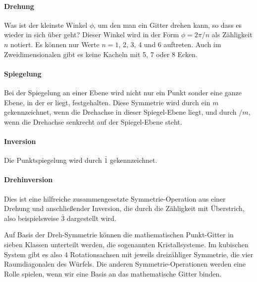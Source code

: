 \paragraph{Drehung} Was ist der kleinste Winkel $\phi$, um den man ein Gitter drehen kann, so dass es wieder in sich über geht? Dieser Winkel wird in der Form $\phi = 2 \pi / n$ als Zähligkeit $n$ notiert. Es können nur Werte $n= 1$, 2, 3, 4 und 6 auftreten. Auch im Zweidimensionalen gibt es keine Kacheln mit 5, 7 oder 8 Ecken.

\paragraph{Spiegelung} Bei der Spiegelung an einer Ebene wird nicht nur ein Punkt sonder eine ganze Ebene, in der er liegt, festgehalten. Diese Symmetrie wird durch ein $m$ gekennzeichnet, wenn die Drehachse in dieser Spiegel-Ebene liegt, und durch $/m$, wenn die Drehachse senkrecht auf der Spiegel-Ebene steht.

\paragraph{Inversion} Die Punktspiegelung wird durch $\bar{1}$ gekennzeichnet.

\paragraph{Drehinversion} Dies ist eine hilfreiche zusammengesetzte Symmetrie-Operation aus einer Drehung und anschließender Inversion, die durch die Zähligkeit mit Überstrich, also beispielsweise $\bar{3}$ dargestellt wird. 

Auf Basis der Dreh-Symmetrie können die mathematischen Punkt-Gitter in sieben Klassen unterteilt werden, die sogenannten Kristallsysteme. Im kubischen System gibt es also 4 Rotationsachsen mit jeweils dreizähliger Symmetrie, die vier Raumdiagonalen des Würfels. Die anderen Symmetrie-Operationen werden eine Rolle spielen, wenn wir eine Basis an das mathematische Gitter binden.



